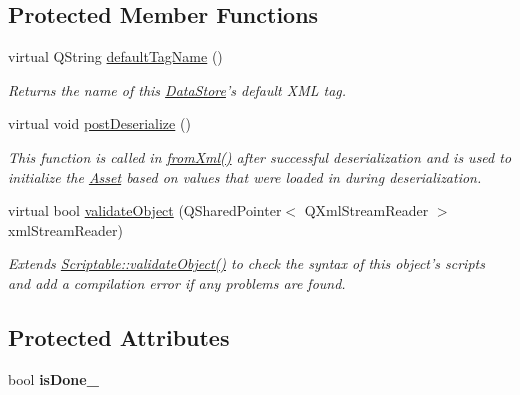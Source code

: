 \subsection*{Protected Member Functions}
\begin{DoxyCompactItemize}
\item 
virtual Q\-String \hyperlink{class_picto_1_1_control_element_a43be19d011bffeb4ff95953a826c4635}{default\-Tag\-Name} ()
\begin{DoxyCompactList}\small\item\em Returns the name of this \hyperlink{class_picto_1_1_data_store}{Data\-Store}'s default X\-M\-L tag. \end{DoxyCompactList}\item 
virtual void \hyperlink{class_picto_1_1_control_element_a51697af839f1b0f3e792516f59fd5941}{post\-Deserialize} ()
\begin{DoxyCompactList}\small\item\em This function is called in \hyperlink{class_picto_1_1_asset_a8bed4da09ecb1c07ce0dab313a9aba67}{from\-Xml()} after successful deserialization and is used to initialize the \hyperlink{class_picto_1_1_asset}{Asset} based on values that were loaded in during deserialization. \end{DoxyCompactList}\item 
\hypertarget{class_picto_1_1_control_element_ae17985c70c242e936bef4d5079235861}{virtual bool \hyperlink{class_picto_1_1_control_element_ae17985c70c242e936bef4d5079235861}{validate\-Object} (Q\-Shared\-Pointer$<$ Q\-Xml\-Stream\-Reader $>$ xml\-Stream\-Reader)}\label{class_picto_1_1_control_element_ae17985c70c242e936bef4d5079235861}

\begin{DoxyCompactList}\small\item\em Extends \hyperlink{class_picto_1_1_scriptable_ab6e2944c43a3b5d418bf7b251594386d}{Scriptable\-::validate\-Object()} to check the syntax of this object's scripts and add a compilation error if any problems are found. \end{DoxyCompactList}\end{DoxyCompactItemize}
\subsection*{Protected Attributes}
\begin{DoxyCompactItemize}
\item 
\hypertarget{class_picto_1_1_control_element_a51e4b565d521ba6c264a8063d0bcd5cd}{bool {\bfseries is\-Done\-\_\-}}\label{class_picto_1_1_control_element_a51e4b565d521ba6c264a8063d0bcd5cd}

\end{DoxyCompactItemize}
